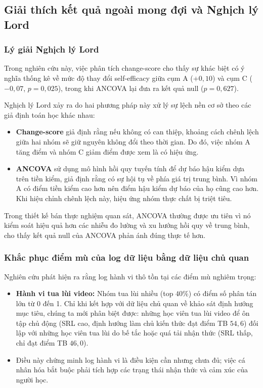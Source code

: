 \subsection{Giải thích kết quả ngoài mong đợi và Nghịch lý Lord}

\subsubsection{Lý giải Nghịch lý Lord}
Trong nghiên cứu này, việc phân tích change-score cho thấy sự khác biệt có ý nghĩa thống kê về mức độ thay đổi self-efficacy giữa cụm A ($+0,10$) và cụm C ($-0,07$, $p = 0,025$), trong khi ANCOVA lại đưa ra kết quả null ($p = 0,627$). 

Nghịch lý Lord xảy ra do hai phương pháp này xử lý sự lệch nền cơ sở theo các giả định toán học khác nhau:
\begin{itemize}
    \item \textbf{Change-score} giả định rằng nếu không có can thiệp, khoảng cách chênh lệch giữa hai nhóm sẽ giữ nguyên không đổi theo thời gian. Do đó, việc nhóm A tăng điểm và nhóm C giảm điểm được xem là có hiệu ứng.
    \item \textbf{ANCOVA} sử dụng mô hình hồi quy tuyến tính để dự báo hậu kiểm dựa trên tiền kiểm, giả định rằng có sự hội tụ về phía giá trị trung bình. Vì nhóm A có điểm tiền kiểm cao hơn nên điểm hậu kiểm dự báo của họ cũng cao hơn. Khi hiệu chỉnh chênh lệch này, hiệu ứng nhóm thực chất bị triệt tiêu.
\end{itemize}

Trong thiết kế bán thực nghiệm quan sát, ANCOVA thường được ưu tiên vì nó kiểm soát hiệu quả hơn các nhiễu đo lường và xu hướng hồi quy về trung bình, cho thấy kết quả null của ANCOVA phản ánh đúng thực tế hơn.

\subsubsection{Khắc phục điểm mù của log dữ liệu bằng dữ liệu chủ quan}
Nghiên cứu phát hiện ra rằng log hành vi thô tồn tại các điểm mù nghiêm trọng:
\begin{itemize}
    \item \textbf{Hành vi tua lùi video:} Nhóm tua lùi nhiều (top $40\%$) có điểm số phân tán lớn từ 0 đến 1. Chỉ khi kết hợp với dữ liệu chủ quan về khảo sát định hướng mục tiêu, chúng ta mới phân biệt được: những học viên tua lùi video để ôn tập chủ động (SRL cao, định hướng làm chủ kiến thức đạt điểm TB $54,6$) đối lập với những học viên tua lùi do bế tắc hoặc quá tải nhận thức (SRL thấp, chỉ đạt điểm TB $46,0$).
    \item Điều này chứng minh log hành vi là điều kiện cần nhưng chưa đủ; việc cá nhân hóa bắt buộc phải tích hợp các trạng thái nhận thức và cảm xúc của người học.
\end{itemize}

